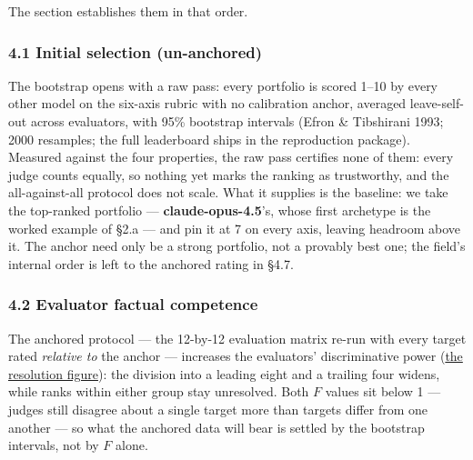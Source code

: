 The section establishes them in that order.

\subsubsection{4.1 Initial selection (un-anchored)}\label{initial-selection-un-anchored}

The bootstrap opens with a raw pass: every portfolio is scored 1--10 by every other model on the six-axis rubric with no calibration anchor, averaged leave-self-out across evaluators, with 95\% bootstrap intervals (Efron \& Tibshirani 1993; 2000 resamples; the full leaderboard ships in the reproduction package). Measured against the four properties, the raw pass certifies none of them: every judge counts equally, so nothing yet marks the ranking as trustworthy, and the all-against-all protocol does not scale. What it supplies is the baseline: we take the top-ranked portfolio --- \textbf{claude-opus-4.5}'s, whose first archetype is the worked example of §2.a --- and pin it at 7 on every axis, leaving headroom above it. The anchor need only be a strong portfolio, not a provably best one; the field's internal order is left to the anchored rating in §4.7.

\subsubsection{4.2 Evaluator factual competence}\label{evaluator-factual-competence}

The anchored protocol --- the 12-by-12 evaluation matrix re-run with every target rated \emph{relative to} the anchor --- increases the evaluators' discriminative power (\hyperref[fig-anchoring-resolution]{the resolution figure}): the division into a leading eight and a trailing four widens, while ranks within either group stay unresolved. Both \(F\) values sit below 1 --- judges still disagree about a single target more than targets differ from one another --- so what the anchored data will bear is settled by the bootstrap intervals, not by \(F\) alone.

\protect{}\label{fig-anchoring-resolution}{}

